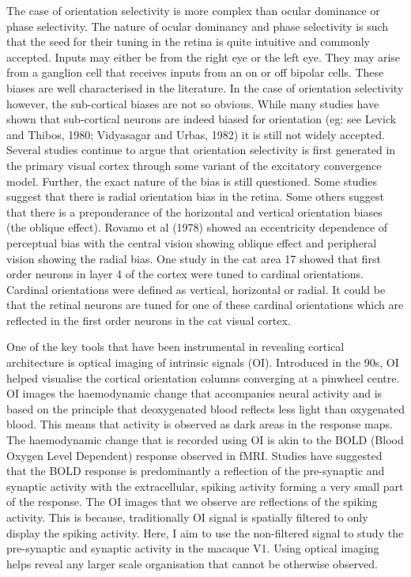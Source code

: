 	
	The case of orientation selectivity is more complex than ocular dominance or phase selectivity. The nature of ocular dominancy and phase selectivity is such that the seed for their tuning in the retina is quite intuitive and commonly accepted. Inputs may either be from the right eye or the left eye. They may arise from a ganglion cell that receives inputs from an on or off bipolar cells. These biases are well characterised in the literature. In the case of orientation selectivity however, the sub-cortical biases are not so obvious. While many studies have shown that sub-cortical neurons are indeed biased for orientation (eg: see Levick and Thibos, 1980; Vidyasagar and Urbas, 1982) it is still not widely accepted. Several studies continue to argue that orientation selectivity is first generated in the primary visual cortex through some variant of the excitatory convergence model. Further, the exact nature of the bias is still questioned. Some studies suggest that there is radial orientation bias in the retina. Some others suggest that there is a preponderance of the horizontal and vertical orientation biases (the oblique effect). Rovamo et al (1978) showed an eccentricity dependence of perceptual bias with the central vision showing oblique effect and peripheral vision showing the radial bias. One study in the cat area 17 showed that first order neurons in layer 4 of the cortex were tuned to cardinal orientations. Cardinal orientations were defined as vertical, horizontal or radial. It could be that the retinal neurons are tuned for one of these cardinal orientations which are reflected in the first order neurons in the cat visual cortex.
	
	
	One of the key tools that have been instrumental in revealing cortical architecture is optical imaging of intrinsic signals (OI). Introduced in the 90s, OI helped visualise the cortical orientation columns converging at a pinwheel centre. OI images the haemodynamic change that accompanies neural activity and is based on the principle that deoxygenated blood reflects less light than oxygenated blood. This means that activity is observed as dark areas in the response maps. The haemodynamic change that is recorded using OI is akin to the BOLD (Blood Oxygen Level Dependent) response observed in fMRI. Studies have suggested that the BOLD response is predominantly a reflection of the pre-synaptic and synaptic activity with the extracellular, spiking activity forming a very small part of the response. The OI images that we observe are reflections of the spiking activity. This is because, traditionally OI signal is spatially filtered to only display the spiking activity. Here, I aim to use the non-filtered signal to study the pre-synaptic and synaptic activity in the macaque V1. Using optical imaging helps reveal any larger scale organisation that cannot be otherwise observed. 
	
